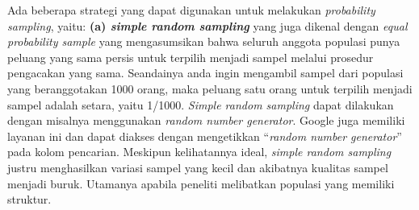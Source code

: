 \documentclass[
  english,
  man]{apa6}
\begin{document}
Ada beberapa strategi yang dapat digunakan untuk melakukan \emph{probability sampling}, yaitu: \textbf{(a) \emph{simple random sampling}} yang juga dikenal dengan \emph{equal probability sample} yang mengasumsikan bahwa seluruh anggota populasi punya peluang yang sama persis untuk terpilih menjadi sampel melalui prosedur pengacakan yang sama. Seandainya anda ingin mengambil sampel dari populasi yang beranggotakan 1000 orang, maka peluang satu orang untuk terpilih menjadi sampel adalah setara, yaitu 1/1000. \emph{Simple random sampling} dapat dilakukan dengan misalnya menggunakan \emph{random number generator}. Google juga memiliki layanan ini dan dapat diakses dengan mengetikkan \enquote{\emph{random number generator}} pada kolom pencarian. Meskipun kelihatannya ideal, \emph{simple random sampling} justru menghasilkan variasi sampel yang kecil dan akibatnya kualitas sampel menjadi buruk. Utamanya apabila peneliti melibatkan populasi yang memiliki struktur.
\end{document}
